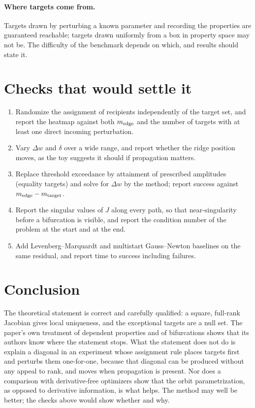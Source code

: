 \documentclass[11pt]{article}
\begin{document}
\paragraph{Where targets come from.} Targets drawn by perturbing a known parameter and recording the properties are guaranteed reachable; targets drawn uniformly from a box in property space may not be. The difficulty of the benchmark depends on which, and results should state it.

\section{Checks that would settle it}

\begin{enumerate}
\item Randomize the assignment of recipients independently of the target set, and report the heatmap against both $m_{\rm edge}$ and the number of targets with at least one direct incoming perturbation.
\item Vary $\Delta w$ and $\delta$ over a wide range, and report whether the ridge position moves, as the toy suggests it should if propagation matters.
\item Replace threshold exceedance by attainment of prescribed amplitudes (equality targets) and solve for $\Delta w$ by the method; report success against $m_{\rm edge}-m_{\rm target}$.
\item Report the singular values of $J$ along every path, so that near-singularity before a bifurcation is visible, and report the condition number of the problem at the start and at the end.
\item Add Levenberg--Marquardt and multistart Gauss--Newton baselines on the same residual, and report time to success including failures.
\end{enumerate}

\section{Conclusion}
\nocite{hirsch,nw,strogatz}

The theoretical statement is correct and carefully qualified: a square, full-rank Jacobian gives local uniqueness, and the exceptional targets are a null set. The paper's own treatment of dependent properties and of bifurcations shows that its authors know where the statement stops. What the statement does not do is explain a diagonal in an experiment whose assignment rule places targets first and perturbs them one-for-one, because that diagonal can be produced without any appeal to rank, and moves when propagation is present. Nor does a comparison with derivative-free optimizers show that the orbit parametrization, as opposed to derivative information, is what helps. The method may well be better; the checks above would show whether and why.
\end{document}
